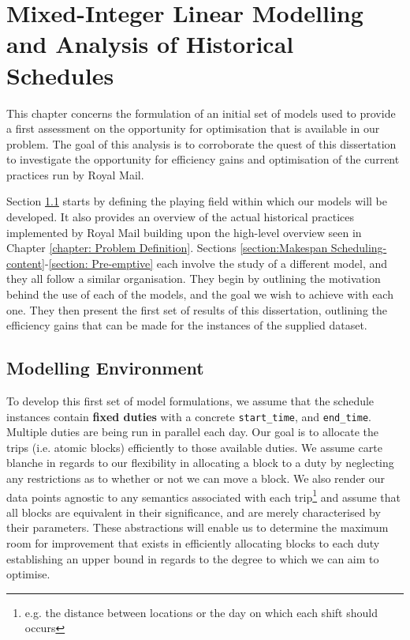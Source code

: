 \chapter{Mixed-Integer Linear Modelling and Analysis of Historical Schedules}
\label{chapter: 2-Evaluating Royal Mail Historical Data}

This chapter concerns the formulation of an initial set of models used to provide a first assessment on the opportunity for optimisation that is available in our problem. The goal of this analysis is to corroborate the quest of this dissertation to investigate the opportunity for efficiency gains and optimisation of the current practices run by Royal Mail. 

\vspace{\baselineskip}
\noindent
Section \ref{section: 4.1} starts by defining the playing field within which our models will be developed. It also provides an overview of the actual historical practices implemented by Royal Mail building upon the high-level overview seen in Chapter \ref{chapter: Problem Definition}. Sections \ref{section:Makespan Scheduling-content}-\ref{section: Pre-emptive} each involve the study of a different model, and they all follow a similar organisation. They begin by outlining the motivation behind the use of each of the models, and the goal we wish to achieve with each one. They then present the first set of results of this dissertation, outlining the efficiency gains that can be made for the instances of the supplied dataset.

\section{Modelling Environment}
\label{section: 4.1}
To develop this first set of model formulations, we assume that the schedule instances contain \textbf{fixed duties} with a concrete \texttt{start\_time}, and \texttt{end\_time}. Multiple duties are being run in parallel each day. Our goal is to allocate the trips (i.e. atomic blocks) efficiently to those available duties. We assume carte blanche in regards to our flexibility in allocating a block to a duty by neglecting any restrictions as to whether or not we can move a block. We also render our data points agnostic to any semantics associated with each trip\footnote{e.g. the distance between locations or the day on which each shift should occurs} and assume that all blocks are equivalent in their significance, and are merely characterised by their parameters. These abstractions will enable us to determine the maximum room for improvement that exists in efficiently allocating blocks to each duty establishing an upper bound in regards to the degree to which we can aim to optimise.

